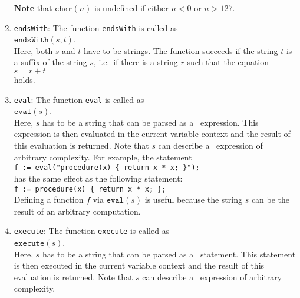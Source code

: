 \begin{enumerate}
      \textbf{Note} that $\texttt{char}(n)$ is undefined if either $n < 0$ or $n > 127$.
\item \texttt{endsWith}: The function \texttt{endsWith} is called as
      \\[0.2cm]
      \hspace*{1.3cm}
      $\texttt{endsWith}(s,t)$.
      \\[0.2cm]
      Here, both $s$ and $t$ have to be strings.  The function succeeds if the string $t$ is a
      suffix of the string $s$, i.e.~if there is a string $r$ such that the equation
      \\[0.2cm]
      \hspace*{1.3cm}
      $s = r + t$
      \\[0.2cm] 
      holds.
\item \texttt{eval}: The function \texttt{eval}  is called as
      \\[0.2cm]
      \hspace*{1.3cm}
      $\mathtt{eval}(s)$.
      \\[0.2cm]
      Here, $s$ has to be a string that can be parsed as a \setlx\ expression.  This expression
      is then evaluated in the current variable context and the result of this evaluation is
      returned.   Note that $s$ can describe a \setlx\ expression of arbitrary complexity.
      For example, the statement
      \\[0.2cm]
      \hspace*{1.3cm}
      \texttt{f := eval("procedure(x) \{ return x * x; \}");}
      \\[0.2cm]
      has the same effect as the following statement:
      \\[0.2cm]
      \hspace*{1.3cm}
      \texttt{f := procedure(x) \{ return x * x; \};}
      \\[0.2cm]
      Defining a function $f$ via $\texttt{eval}(s)$ is useful because the string $s$
      can be the result of an arbitrary computation.  
\item \texttt{execute}: The function \texttt{execute}  is called as
      \\[0.2cm]
      \hspace*{1.3cm}
      $\mathtt{execute}(s)$.
      \\[0.2cm]
      Here, $s$ has to be a string that can be parsed as a \setlx\ statement.  This statement
      is then executed in the current variable context and the result of this evaluation is
      returned.   Note that $s$ can describe a \setlx\ expression of arbitrary complexity.

\end{enumerate}
